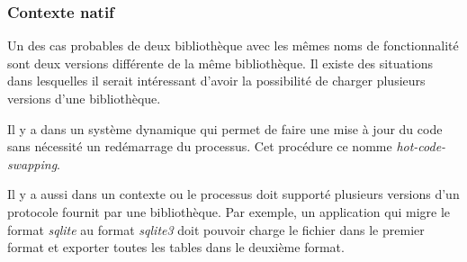 \subsubsection{Contexte natif}

Un des cas probables de deux bibliothèque avec les mêmes noms de fonctionnalité
sont deux versions différente de la même bibliothèque. Il existe des situations
dans lesquelles il serait intéressant d'avoir la possibilité de charger plusieurs
versions d'une bibliothèque.

Il y a dans un système dynamique qui permet de faire une mise à jour du
code sans nécessité un redémarrage du processus. Cet procédure ce nomme
\textit{hot-code-swapping}.

Il y a aussi dans un contexte ou le processus doit supporté plusieurs versions
d'un protocole fournit par une bibliothèque. Par exemple, un application qui migre
le format \textit{sqlite} au format \textit{sqlite3} doit pouvoir charge le fichier
dans le premier format et exporter toutes les tables dans le deuxième format.

